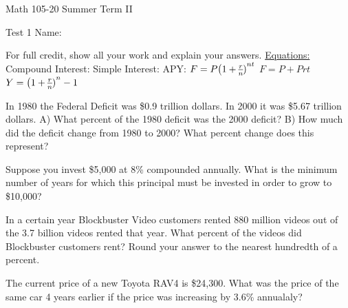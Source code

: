 \documentclass[11pt,epsfig]{article}
\begin{document}
Math 105-20 Summer Term II 

Test 1 \hspace{1.9in} {Name:} {\underline {\hspace{3.5in}}}
\vspace{2pc}

For full credit, show all your work and explain your answers.
\newline
\newline
\underline{Equations:}
\newline
Compound Interest: \hspace{2.5cm}  Simple Interest:   \hspace{2.5cm} APY:
\newline
$F=P\big{(1+\frac{r}{n})}^{nt}$ 
\hspace{3.5cm} $F=P+Prt$
\hspace{3.0cm} $Y=\big{(1+\frac{r}{n})}^{n}-1$

\vspace{2pc}

\begin{problem}{25}
In 1980 the Federal Deficit was \$0.9 trillion dollars. In 2000 it was \$5.67 trillion dollars.
\newline
A) What percent of the 1980 deficit was the 2000 deficit?
\newline
B) How much did the deficit change from 1980 to 2000? What percent change does this represent?
\vfill
\end{problem}

\begin{problem}{25}
Suppose you invest \$5,000 at 8\% compounded annually. What is the minimum number of years for which this principal must be invested in order to grow to \$10,000?
\vfill
\end{problem}

\newpage

\begin{problem}{25}
In a certain year Blockbuster Video customers rented 880 million videos out of the 3.7 billion videos rented that year. What percent of the videos did Blockbuster customers rent? Round your answer to the nearest hundredth of a percent.
\vfill
\end{problem}

\begin{problem}{25}
The current price of a new Toyota RAV4 is \$24,300. What was the price of the same car 4 years earlier if the price was increasing by 3.6\% annualaly? 
\vfill
\end{problem}
\end{document}
